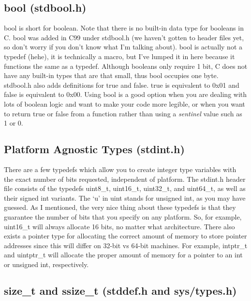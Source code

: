 \documentclass{article}
\begin{document}
\subsection{bool (stdbool.h)}

bool is short for boolean. Note that there is no built-in data type for booleans in C. bool was added in C99
under stdbool.h (we haven’t gotten to header files yet, so don’t worry if you don’t know what I’m talking
about). bool is actually not a typedef (hehe), it is technically a macro, but I've lumped it in here because it
functions the same as a typedef. Although booleans only require 1 bit, C does not have any built-in types that
are that small, thus bool occupies one byte. stdbool.h also adds definitions for true and false. true is
equivalent to 0x01 and false is equivalent to 0x00. Using bool is a good option when you are dealing with lots
of boolean logic and want to make your code more legible, or when you want to return true or false from a
function rather than using a \textit{sentinel} value such as 1 or 0.

\subsection{Platform Agnostic Types (stdint.h)}

There are a few typedefs which allow you to create integer type variables with the exact number of bits
requested, independent of platform. The stdint.h header file consists of the typedefs uint8\_t, uint16\_t,
uint32\_t, and uint64\_t, as well as their signed int variants. The ‘u’ in uint stands for unsigned int, as you
may have guessed. As I mentioned, the very nice thing about these typedefs is that they guarantee the number
of bits that you specify on any platform. So, for example, uint16\_t will always allocate 16 bits, no matter
what architecture. There also exists a pointer type for allocating the correct amount of memory to store
pointer addresses since this will differ on 32-bit vs 64-bit machines. For example, intptr\_t and uintptr\_t
will allocate the proper amount of memory for a pointer to an int or unsigned int, respectively.

\subsection{size\_t and ssize\_t (stddef.h and sys/types.h)}
\end{document}
